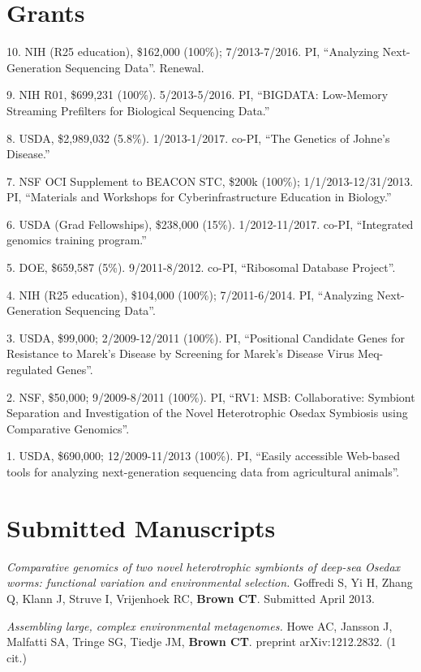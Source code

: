 \documentclass[margin,line]{resume}
\begin{document}
\begin{resume}
    \section{\mysidestyle Grants}

10. NIH (R25 education), \$162,000 (100\%); 7/2013-7/2016.  PI, ``Analyzing Next-Generation Sequencing Data''. Renewal.

9. NIH R01, \$699,231 (100\%). 5/2013-5/2016. PI, ``BIGDATA: Low-Memory Streaming Prefilters for Biological Sequencing Data.''

8. USDA, \$2,989,032 (5.8\%). 1/2013-1/2017.  co-PI, ``The Genetics of Johne's Disease.''

7. NSF OCI Supplement to BEACON STC, \$200k (100\%); 1/1/2013-12/31/2013.  PI, ``Materials and Workshops for Cyberinfrastructure Education in Biology.''

6. USDA (Grad Fellowships), \$238,000 (15\%).  1/2012-11/2017.  co-PI, ``Integrated genomics training program.''

5. DOE, \$659,587 (5\%).  9/2011-8/2012.  co-PI, ``Ribosomal Database Project''.

4. NIH (R25 education), \$104,000 (100\%); 7/2011-6/2014.  PI, ``Analyzing Next-Generation Sequencing Data''.

3. USDA, \$99,000; 2/2009-12/2011 (100\%).  PI, ``Positional Candidate Genes for Resistance to Marek's
Disease by Screening for Marek's Disease Virus Meq-regulated Genes''.

2. NSF, \$50,000; 9/2009-8/2011 (100\%).  PI, ``RV1: MSB: Collaborative: Symbiont Separation and Investigation of the Novel Heterotrophic Osedax Symbiosis using Comparative Genomics''.

1. USDA, \$690,000; 12/2009-11/2013 (100\%).  PI, ``Easily accessible Web-based tools for analyzing next-generation sequencing data from agricultural animals''.  

    \section{\mysidestyle Submitted Manuscripts}

{\em Comparative genomics of two novel heterotrophic symbionts of deep-sea Osedax worms: functional variation and environmental selection.} Goffredi S, Yi H, Zhang Q, Klann J, Struve I, Vrijenhoek RC, {\bf Brown CT}. Submitted April 2013.

{\em Assembling large, complex environmental metagenomes.} Howe AC, Jansson J, Malfatti SA, Tringe SG, Tiedje JM, {\bf Brown CT}. preprint arXiv:1212.2832. (1 cit.)


\end{resume}
\end{document}
